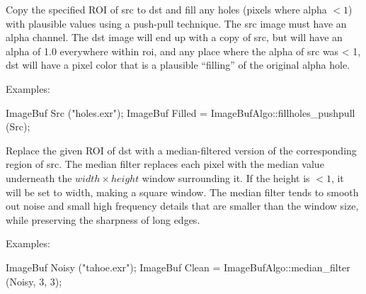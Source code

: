  
Copy the specified ROI of {\cf src} to {\cf dst} and fill any
holes (pixels where alpha $< 1$) with plausible values using a push-pull
technique.  The {\cf src} image must have
an alpha channel.  The dst image will end up with a copy of src, but
will have an alpha of 1.0 everywhere within {\cf roi},
and any place where the alpha
of src was < 1, dst will have a pixel color that is a plausible
``filling'' of the original alpha hole.

\smallskip
\noindent Examples:
\begin{code}
    ImageBuf Src ("holes.exr");
    ImageBuf Filled = ImageBufAlgo::fillholes_pushpull (Src);
\end{code}
\apiend


 

Replace the given ROI of {\cf dst} with a median-filtered version of the
corresponding region of {\cf src}.  The median filter replaces each pixel
with the median value underneath the $\mathit{width} \times \mathit{height}$
window surrounding it. If the height is $< 1$, it will be set to width,
making a square window. The median filter tends to smooth out noise and
small high frequency details that are smaller than the window size, while
preserving the sharpness of long edges.

\smallskip
\noindent Examples:
\begin{code}
    ImageBuf Noisy ("tahoe.exr");
    ImageBuf Clean = ImageBufAlgo::median_filter (Noisy, 3, 3);
\end{code}

